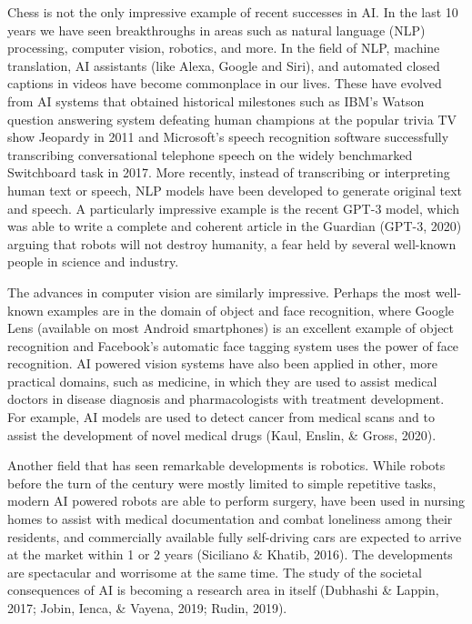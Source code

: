 Chess is not the only impressive example of recent successes in AI.
In the last 10 years we have seen breakthroughs in areas such as
natural language (NLP) processing, computer vision, robotics, and more.
In the field of NLP, machine translation, AI assistants
(like Alexa, Google and Siri), and automated closed captions in videos
have become commonplace in our lives.
These have evolved from AI systems that obtained historical milestones
such as IBM's Watson question answering system defeating human
champions at the popular trivia TV show Jeopardy in 2011 and Microsoft's
speech recognition software successfully transcribing conversational
telephone speech on the widely benchmarked Switchboard task in 2017.
More recently, instead of transcribing or interpreting human text or
speech, NLP models have been developed to generate original text and
speech.
A particularly impressive example is the recent GPT-3 model, which was
able to write a complete and coherent article in the Guardian
(GPT-3, 2020) arguing that robots will not destroy humanity, a fear held
by several well-known people in science and industry.

The advances in computer vision are similarly impressive.
Perhaps the most well-known examples are in the domain of object and
face recognition, where Google Lens (available on most Android
smartphones) is an excellent example of object recognition and
Facebook's automatic face tagging system uses the power of face
recognition.
AI powered vision systems have also been applied in other, more
practical domains, such as medicine, in which they are used to assist
medical doctors in disease diagnosis and pharmacologists with
treatment development.
For example, AI models are used to detect cancer from medical scans
and to assist the development of novel medical drugs
(Kaul, Enslin, \& Gross, 2020).

Another field that has seen remarkable developments is robotics.
While robots before the turn of the century were mostly limited to
simple repetitive tasks, modern AI powered robots are able to perform
surgery, have been used in nursing homes to assist with medical
documentation and combat loneliness among their residents, and
commercially available fully self-driving cars are expected to arrive
at the market within 1 or 2 years (Siciliano \& Khatib, 2016).
The developments are spectacular and worrisome at the same time.
The study of the societal consequences of AI is becoming a research
area in itself (Dubhashi \& Lappin, 2017;
Jobin, Ienca, \& Vayena, 2019; Rudin, 2019).
